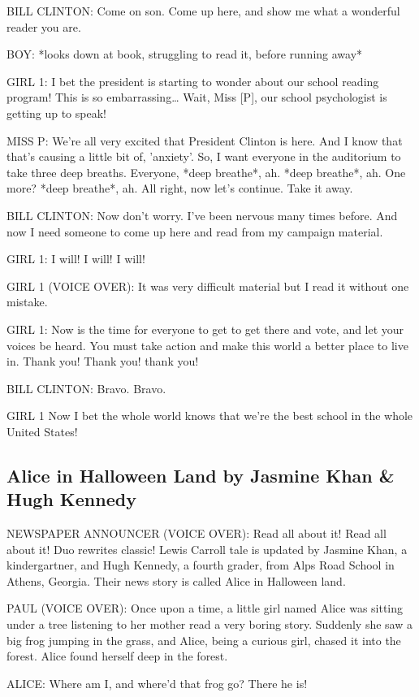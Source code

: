BILL CLINTON:
Come on son.
Come up here, and show me what a wonderful reader you are.

BOY:
*looks down at book, struggling to read it, before running away*

GIRL 1:
I bet the president is starting to wonder about our school reading program!
This is so embarrassing\dots
Wait, Miss [P], our school psychologist is getting up to speak!

MISS P:
We're all very excited that President Clinton is here.
And I know that that's causing a little bit of, 'anxiety'.
So, I want everyone in the auditorium to take three deep breaths.
Everyone, *deep breathe*, ah.
*deep breathe*, ah.
One more?
*deep breathe*, ah.
All right, now let's continue.
Take it away.

BILL CLINTON:
Now don't worry.
I've been nervous many times before.
And now I need someone to come up here and read from my campaign material.

GIRL 1:
I will!
I will!
I will!

GIRL 1 (VOICE OVER):
It was very difficult material but I read it without one mistake.

GIRL 1:
Now is the time for everyone to get to get there and vote, and let your voices be heard.
You must take action and make this world a better place to live in.
Thank you!
Thank you!
thank you!

BILL CLINTON:
Bravo.
Bravo.

GIRL 1
Now I bet the whole world knows that we're the best school in the whole United States!

\subsection{Alice in Halloween Land by Jasmine Khan \& Hugh Kennedy}

NEWSPAPER ANNOUNCER (VOICE OVER):
Read all about it!
Read all about it!
Duo rewrites classic!
Lewis Carroll tale is updated by Jasmine Khan, a kindergartner, and Hugh Kennedy, a fourth grader, from Alps Road School in Athens, Georgia.
Their news story is called Alice in Halloween land.

PAUL (VOICE OVER):
Once upon a time, a little girl named Alice was sitting under a tree listening to her mother read a very boring story.
Suddenly she saw a big frog jumping in the grass, and Alice, being a curious girl, chased it into the forest.
Alice found herself deep in the forest.

ALICE:
Where am I, and where'd that frog go?
There he is!

